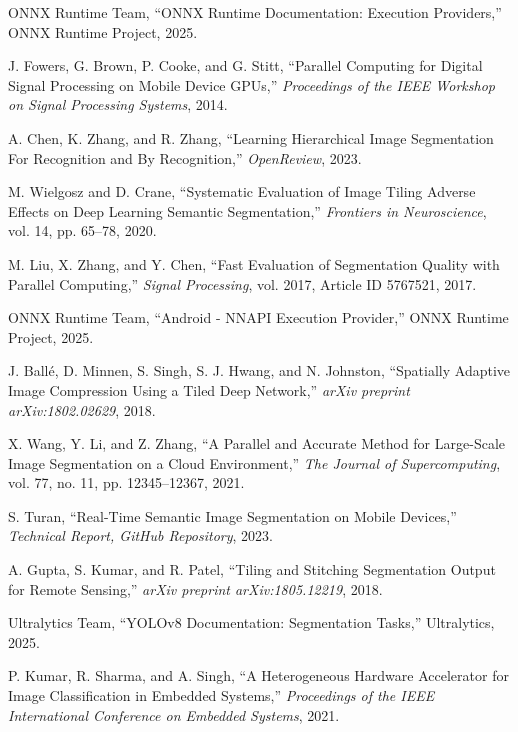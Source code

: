\documentclass[conference]{IEEEtran}
\begin{document}
\begin{thebibliography}{12}

ONNX Runtime Team, “ONNX Runtime Documentation: Execution Providers,” ONNX Runtime Project, 2025.

J. Fowers, G. Brown, P. Cooke, and G. Stitt, “Parallel Computing for Digital Signal Processing on Mobile Device GPUs,” \emph{Proceedings of the IEEE Workshop on Signal Processing Systems}, 2014.

A. Chen, K. Zhang, and R. Zhang, “Learning Hierarchical Image Segmentation For Recognition and By Recognition,” \emph{OpenReview}, 2023.

M. Wielgosz and D. Crane, “Systematic Evaluation of Image Tiling Adverse Effects on Deep Learning Semantic Segmentation,” \emph{Frontiers in Neuroscience}, vol. 14, pp. 65–78, 2020.

M. Liu, X. Zhang, and Y. Chen, “Fast Evaluation of Segmentation Quality with Parallel Computing,” \emph{Signal Processing}, vol. 2017, Article ID 5767521, 2017.

ONNX Runtime Team, “Android - NNAPI Execution Provider,” ONNX Runtime Project, 2025.

J. Ballé, D. Minnen, S. Singh, S. J. Hwang, and N. Johnston, “Spatially Adaptive Image Compression Using a Tiled Deep Network,” \emph{arXiv preprint arXiv:1802.02629}, 2018.

X. Wang, Y. Li, and Z. Zhang, “A Parallel and Accurate Method for Large-Scale Image Segmentation on a Cloud Environment,” \emph{The Journal of Supercomputing}, vol. 77, no. 11, pp. 12345–12367, 2021.

S. Turan, “Real-Time Semantic Image Segmentation on Mobile Devices,” \emph{Technical Report, GitHub Repository}, 2023.

A. Gupta, S. Kumar, and R. Patel, “Tiling and Stitching Segmentation Output for Remote Sensing,” \emph{arXiv preprint arXiv:1805.12219}, 2018.

Ultralytics Team, “YOLOv8 Documentation: Segmentation Tasks,” Ultralytics, 2025.

P. Kumar, R. Sharma, and A. Singh, “A Heterogeneous Hardware Accelerator for Image Classification in Embedded Systems,” \emph{Proceedings of the IEEE International Conference on Embedded Systems}, 2021.

\end{thebibliography}
\end{document}
